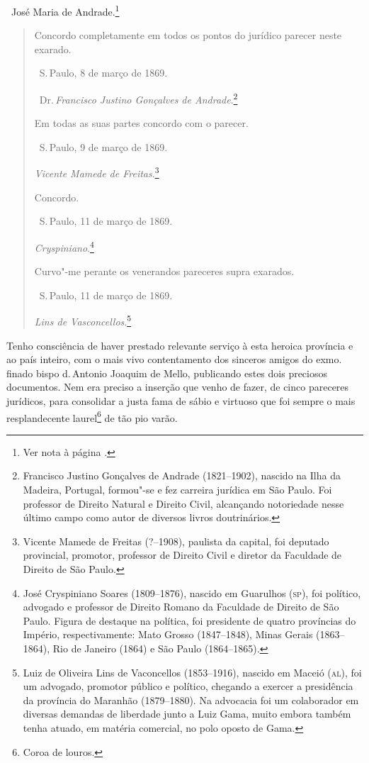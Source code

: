 \hfill\ José Maria de Andrade.\footnote{Ver nota à página \pageref{maria}.}

\begin{quote}
Concordo completamente em todos os pontos do jurídico parecer neste exarado.

\qquad\ S.\,Paulo, 8 de março de 1869.

\qquad\ Dr.\,\emph{Francisco Justino Gonçalves de Andrade}.\footnote{Francisco \label{justino}
  Justino Gonçalves de Andrade (1821--1902), nascido na Ilha da Madeira,
  Portugal, formou"-se e fez carreira jurídica em São Paulo. Foi
  professor de Direito Natural e Direito Civil, alcançando notoriedade
  nesse último campo como autor de diversos livros doutrinários.}\bigskip

Em todas as suas partes concordo com o parecer.

\qquad\ S.\,Paulo, 9 de março de 1869.

\qquad\emph{Vicente Mamede de Freitas}.\footnote{Vicente Mamede de Freitas
  (?--1908), paulista da capital, foi deputado provincial, promotor,
  professor de Direito Civil e diretor da Faculdade de Direito de São
  Paulo.}\bigskip

Concordo.

\qquad\ S.\,Paulo, 11 de março de 1869.

\qquad\emph{Cryspiniano}.\footnote{José Cryspiniano Soares (1809--1876),
  nascido em Guarulhos (\textsc{sp}), foi político, advogado e professor de
  Direito Romano da Faculdade de Direito de São Paulo. Figura de
  destaque na política, foi presidente de quatro províncias do Império,
  respectivamente: Mato Grosso (1847--1848), Minas Gerais (1863--1864),
  Rio de Janeiro (1864) e São Paulo (1864--1865).}\bigskip

Curvo"-me perante os venerandos pareceres supra exarados.

\qquad\ S.\,Paulo, 11 de março de 1869.

\qquad\emph{Lins de Vasconcellos}.\footnote{Luiz de Oliveira Lins de
  Vaconcellos (1853--1916), nascido em Maceió (\textsc{al}), foi um advogado,
  promotor público e político, chegando a exercer a presidência da
  província do Maranhão (1879--1880). Na advocacia foi um colaborador em
  diversas demandas de liberdade junto a Luiz Gama, muito embora também
  tenha atuado, em matéria comercial, no polo oposto de Gama.}
  \end{quote}

Tenho consciência de haver prestado relevante serviço à esta heroica
província e ao país inteiro, com o mais vivo contentamento dos sinceros
amigos do exmo.\,finado bispo d.\,Antonio Joaquim de Mello, publicando
estes dois preciosos documentos. Nem era preciso a inserção que venho de
fazer, de cinco pareceres jurídicos, para consolidar a justa fama de
sábio e virtuoso que foi sempre o mais resplandecente laurel\footnote{
  Coroa de louros.} de tão pio varão.

